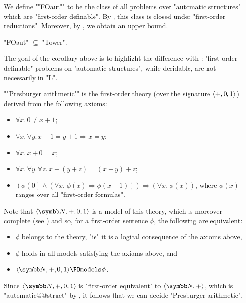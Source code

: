 We define \AP""FOaut"" to be the class of all problems over "automatic structures"
which are "first-order definable". By ,
this class is closed under "first-order reductions". Moreover,
by , we obtain an upper bound.

\begin{corollary}
	"FOaut" $\subseteq$ "Tower".
\end{corollary}

The goal of the corollary above is to highlight the difference with :
"first-order definable" problems on "automatic structures", while decidable, are not necessarily
in "L".

\begin{remark}
	\AP""Presburger arithmetic"" is the first-order theory (over the signature $\langle+, 0, 1\rangle$)
	derived from the following axioms:
	\begin{itemize}
		\item $\forall x.\, 0 \neq x + 1$;
		\item $\forall x.\,\forall y.\, x + 1 = y + 1 \Rightarrow x = y$;
		\item $\forall x.\, x + 0 = x$;
		\item $\forall x.\,\forall y.\,\forall z.\, x + (y + z) = (x + y) + z$;
		\item $(\phi(0) \land (\forall x.\; \phi(x) \Rightarrow \phi(x+1))) \Rightarrow
			(\forall x.\; \phi(x))$, where $\phi(x)$ ranges over all "first-order formulas".
	\end{itemize}
	Note that $\tup{\N,+,0,1}$ is a model of this theory, which is moreover complete
	(see \cite{Stansifer1984Presburger}) and so, for a first-order sentence $\phi$, the following 
	are equivalent:
	\begin{itemize}
		\item $\phi$ belongs to the theory, "ie" it is a logical consequence of the axioms above,
		\item $\phi$ holds in all models satisfying the axioms above, and 
		\item $\tup{\N, +, 0, 1} \FOmodels \phi$.
	\end{itemize}
	Since $\tup{\N, +, 0, 1}$ is "first-order equivalent" to $\tup{\N, +}$, which
	is "automatic@@struct" by ,
	it follows that we can decide "Presburger arithmetic".
\end{remark}

